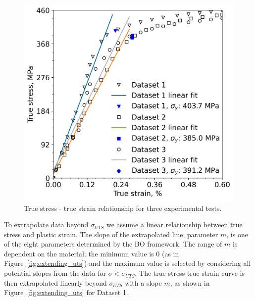 \documentclass[preprint, review, 12pt]{elsarticle}
\begin{document}
	\begin{figure}[!htbp]
		\centering
		\includegraphics[width=\linewidth, height=0.4\textheight, keepaspectratio]{SECOND_DERIV}
		\caption{True stress - true strain relationship for three experimental tests.}
		\label{fig:linear_region}
	\end{figure}

	To extrapolate data beyond $\sigma_{UTS}$ we assume a linear relationship between true stress and plastic strain.
	The slope of the extrapolated line, parameter $m$, is one of the eight parameters determined by the BO framework.
	The range of $m$ is dependent on the material; the minimum value is 0 (as in Figure~\ref{fig:extending_uts}) and the maximum value is selected by considering all potential slopes from the data for $\sigma<\sigma_{UTS}$.
 	The true stress-true strain curve is then extrapolated linearly beyond $\sigma_{UTS}$ with a slope $m$, as shown in Figure~\ref{fig:extending_uts} for Dataset 1.
\end{document}
